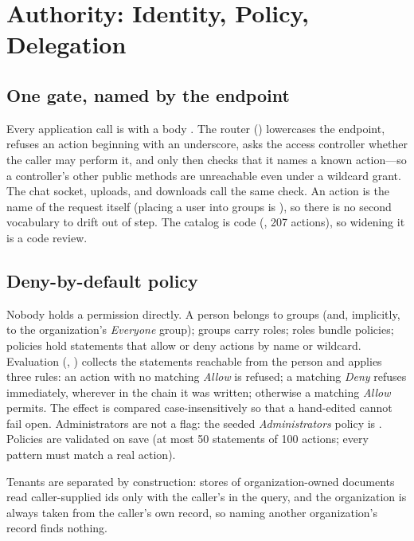 \section{Authority: Identity, Policy, Delegation}
\label{sec:authority}

\subsection{One gate, named by the endpoint}

Every application call is  with a body
.
The router () lowercases the
endpoint, refuses an action beginning with an underscore, asks the
access controller whether the caller may perform it, and only then
checks that it names a known action---so a controller's other public
methods are unreachable even under a wildcard grant. The chat socket,
uploads, and downloads call the same check. An action is the name of
the request itself (placing a user into groups is
), so there is no second vocabulary to drift
out of step. The catalog is code
(, 207 actions), so
widening it is a code review.

\subsection{Deny-by-default policy}

Nobody holds a permission directly. A person belongs to groups (and,
implicitly, to the organization's \emph{Everyone} group); groups carry
roles; roles bundle policies; policies hold statements that allow or
deny actions by name or wildcard. Evaluation
(, )
collects the statements reachable from the person and applies three
rules: an action with no matching \emph{Allow} is refused; a matching
\emph{Deny} refuses immediately, wherever in the chain it was written;
otherwise a matching \emph{Allow} permits. The effect is compared
case-insensitively so that a hand-edited  cannot fail
open. Administrators are not a flag: the seeded \emph{Administrators}
policy is . Policies are validated on save (at most
50 statements of 100 actions; every pattern must match a real action).

Tenants are separated by construction: stores of organization-owned
documents read caller-supplied ids only with the caller's
 in the query, and the organization is always taken from
the caller's own record, so naming another organization's record finds
nothing.

